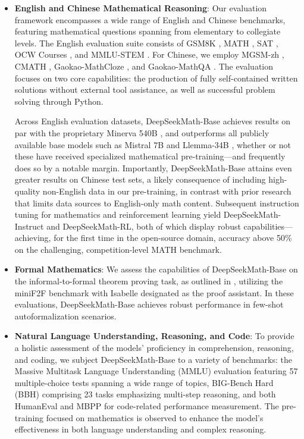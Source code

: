 \begin{itemize}[topsep=0pt]
    \item \textbf{English and Chinese Mathematical Reasoning}: Our evaluation framework encompasses a wide range of English and Chinese benchmarks, featuring mathematical questions spanning from elementary to collegiate levels. The English evaluation suite consists of GSM8K \citep{gsm8k}, MATH \citep{MATH}, SAT \citep{llemma}, OCW Courses \citep{minerva}, and MMLU-STEM \citep{mmlu}. For Chinese, we employ MGSM-zh \citep{mgsm}, CMATH \citep{wei2023cmath}, Gaokao-MathCloze \citep{agieval}, and Gaokao-MathQA \citep{agieval}. The evaluation focuses on two core capabilities: the production of fully self-contained written solutions without external tool assistance, as well as successful problem solving through Python.

Across English evaluation datasets, DeepSeekMath-Base achieves results on par with the proprietary Minerva 540B \citep{minerva}, and outperforms all publicly available base models such as Mistral 7B \citep{mistral} and Llemma-34B \citep{llemma}, whether or not these have received specialized mathematical pre-training—and frequently does so by a notable margin. Importantly, DeepSeekMath-Base attains even greater results on Chinese test sets, a likely consequence of including high-quality non-English data in our pre-training, in contrast with prior research \citep{minerva,llemma} that limits data sources to English-only math content. Subsequent instruction tuning for mathematics and reinforcement learning yield DeepSeekMath-Instruct and DeepSeekMath-RL, both of which display robust capabilities—achieving, for the first time in the open-source domain, accuracy above 50\% on the challenging, competition-level MATH benchmark.

\item \textbf{Formal Mathematics}: We assess the capabilities of DeepSeekMath-Base on the informal-to-formal theorem proving task, as outlined in \citep{dsp_proof}, utilizing the miniF2F benchmark \citep{minif2f} with Isabelle \citep{isabelle} designated as the proof assistant. In these evaluations, DeepSeekMath-Base achieves robust performance in few-shot autoformalization scenarios.
\item \textbf{Natural Language Understanding, Reasoning, and Code}: To provide a holistic assessment of the models’ proficiency in comprehension, reasoning, and coding, we subject DeepSeekMath-Base to a variety of benchmarks: the Massive Multitask Language Understanding (MMLU) evaluation \citep{mmlu} featuring 57 multiple-choice tests spanning a wide range of topics, BIG-Bench Hard (BBH) \citep{bbh} comprising 23 tasks emphasizing multi-step reasoning, and both HumanEval \citep{codex} and MBPP \citep{mbpp} for code-related performance measurement. The pre-training focused on mathematics is observed to enhance the model’s effectiveness in both language understanding and complex reasoning.


\end{itemize}
